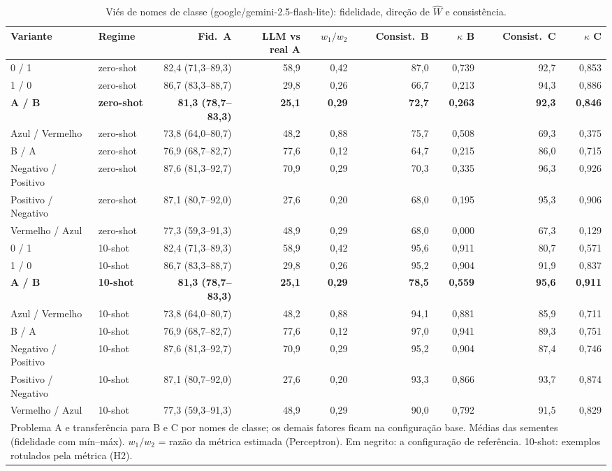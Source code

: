 \begin{table}[htbp]
\centering
\small
\caption{Viés de nomes de classe (google/gemini-2.5-flash-lite): fidelidade, direção de $\hat{W}$ e consistência.}
\label{tab:bloco1_vies_nomes_classe_flashlite}
\begin{tabular}{llrrrrrrr}
\toprule
Variante & Regime & Fid.\ A & LLM vs real A & $w_1/w_2$ & Consist.\ B & $\kappa$ B & Consist.\ C & $\kappa$ C \\
\midrule
0 / 1 & zero-shot & 82,4 (71,3–89,3) & 58,9 & 0,42 & 87,0 & 0,739 & 92,7 & 0,853 \\
1 / 0 & zero-shot & 86,7 (83,3–88,7) & 29,8 & 0,26 & 66,7 & 0,213 & 94,3 & 0,886 \\
\textbf{A / B} & \textbf{zero-shot} & \textbf{81,3 (78,7–83,3)} & \textbf{25,1} & \textbf{0,29} & \textbf{72,7} & \textbf{0,263} & \textbf{92,3} & \textbf{0,846} \\
Azul / Vermelho & zero-shot & 73,8 (64,0–80,7) & 48,2 & 0,88 & 75,7 & 0,508 & 69,3 & 0,375 \\
B / A & zero-shot & 76,9 (68,7–82,7) & 77,6 & 0,12 & 64,7 & 0,215 & 86,0 & 0,715 \\
Negativo / Positivo & zero-shot & 87,6 (81,3–92,7) & 70,9 & 0,29 & 70,3 & 0,335 & 96,3 & 0,926 \\
Positivo / Negativo & zero-shot & 87,1 (80,7–92,0) & 27,6 & 0,20 & 68,0 & 0,195 & 95,3 & 0,906 \\
Vermelho / Azul & zero-shot & 77,3 (59,3–91,3) & 48,9 & 0,29 & 68,0 & 0,000 & 67,3 & 0,129 \\
\midrule
0 / 1 & 10-shot & 82,4 (71,3–89,3) & 58,9 & 0,42 & 95,6 & 0,911 & 80,7 & 0,571 \\
1 / 0 & 10-shot & 86,7 (83,3–88,7) & 29,8 & 0,26 & 95,2 & 0,904 & 91,9 & 0,837 \\
\textbf{A / B} & \textbf{10-shot} & \textbf{81,3 (78,7–83,3)} & \textbf{25,1} & \textbf{0,29} & \textbf{78,5} & \textbf{0,559} & \textbf{95,6} & \textbf{0,911} \\
Azul / Vermelho & 10-shot & 73,8 (64,0–80,7) & 48,2 & 0,88 & 94,1 & 0,881 & 85,9 & 0,711 \\
B / A & 10-shot & 76,9 (68,7–82,7) & 77,6 & 0,12 & 97,0 & 0,941 & 89,3 & 0,751 \\
Negativo / Positivo & 10-shot & 87,6 (81,3–92,7) & 70,9 & 0,29 & 95,2 & 0,904 & 87,4 & 0,746 \\
Positivo / Negativo & 10-shot & 87,1 (80,7–92,0) & 27,6 & 0,20 & 93,3 & 0,866 & 93,7 & 0,874 \\
Vermelho / Azul & 10-shot & 77,3 (59,3–91,3) & 48,9 & 0,29 & 90,0 & 0,792 & 91,5 & 0,829 \\
\bottomrule
\multicolumn{9}{p{0.95\linewidth}}{\footnotesize Problema A e transferência para B e C por nomes de classe; os demais fatores ficam na configuração base. Médias das sementes (fidelidade com mín–máx). $w_1/w_2$ = razão da métrica estimada (Perceptron). Em negrito: a configuração de referência. 10-shot: exemplos rotulados pela métrica (H2).} \\
\end{tabular}
\end{table}
